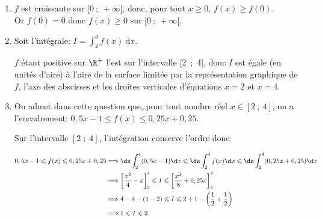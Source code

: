 \begin{enumerate}
\item %
$f$ est croissante sur $[0~;~+ \infty[$, donc, pour tout $x\geqslant 0$, $f(x)\geqslant f(0)$.\\ Or $f(0)=0$ donc  $f(x) \geqslant 0$ sur $[0~;~+\infty[$.

\item Soit l'intégrale:
$I = \displaystyle\int_2^4 f(x)\:\text{d}x.$

$f$ étant positive sur $\R^+$ l'est sur l'intervalle [2~;~4], donc $I$ est égale (en unités d'aire) à l'aire de la surface limitée par la représentation graphique de $f$, l'axe des abscisses et les droites verticales d'équations  $x = 2$ et $x = 4$.

\item On admet dans cette question que, pour tout nombre réel $x \in [2~;~4]$, on a
l'encadrement:
$0,5x - 1 \leqslant f(x) \leqslant 0,25x + 0,25.$


Sur l'intervalle $[2\;;\;4]$, l'intégration conserve l'ordre donc:

$\begin{aligned}
0,5x - 1 \leqslant f(x) \leqslant 0,25x + 0,25
& \Longrightarrow \ds\int_2^4 (0,5x - 1) \d x \leqslant \ds\int_2^4 f(x) \d x \leqslant \ds\int_2^4(0,25x + 0,25) \d x\\
& \Longrightarrow\left[\dfrac{x^2}{4}  - x\right]^4_2 \leqslant I \leqslant \left[\dfrac{x^2}{8} + 0,25x  \right]^4_2\\
& \Longrightarrow 4 - 4 - (1 - 2) \leqslant I \leqslant 2 + 1 - \left(\dfrac12 + \dfrac12\right)\\
& \Longrightarrow 1 \leqslant I \leqslant 2
\end{aligned}$

\end{enumerate}

\bigskip

